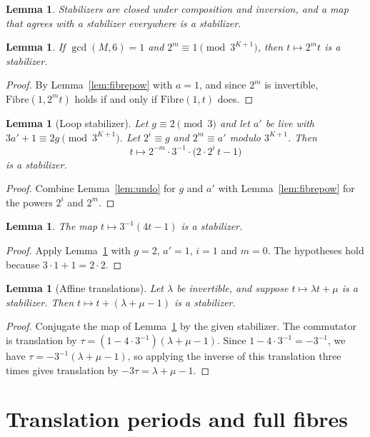\documentclass[11pt,reqno,oneside]{amsart}
\theoremstyle{plain}
\newtheorem{lemma}[theorem]{Lemma}
\theoremstyle{definition}
\numberwithin{equation}{section}
\begin{document}
\begin{lemma}\label{lem:stabcomp}
Stabilizers are closed under composition and inversion, and a map that agrees with a stabilizer everywhere is a stabilizer.
\end{lemma}

\begin{lemma}\label{lem:stabmul}
If $\gcd(M,6)=1$ and $2^m\equiv1\pmod{3^{K+1}}$, then $t\mapsto2^mt$ is a stabilizer.
\end{lemma}
\begin{proof}
By Lemma~\ref{lem:fibrepow} with $a=1$, and since $2^m$ is invertible, $\mathrm{Fibre}(1,2^mt)$ holds if and only if $\mathrm{Fibre}(1,t)$ does.
\end{proof}

\begin{lemma}[Loop stabilizer]\label{lem:loop}
Let $g\equiv2\pmod 3$ and let $a'$ be live with $3a'+1\equiv2g\pmod{3^{K+1}}$. Let $2^i\equiv g$ and $2^m\equiv a'$ modulo $3^{K+1}$. Then
\[
t\longmapsto 2^{-m}\cdot 3^{-1}\cdot\bigl(2\cdot 2^i\,t-1\bigr)
\]
is a stabilizer.
\end{lemma}
\begin{proof}
Combine Lemma~\ref{lem:undo} for $g$ and $a'$ with Lemma~\ref{lem:fibrepow} for the powers $2^i$ and $2^m$.
\end{proof}

\begin{lemma}\label{lem:ell}
The map $t\mapsto3^{-1}(4t-1)$ is a stabilizer.
\end{lemma}
\begin{proof}
Apply Lemma~\ref{lem:loop} with $g=2$, $a'=1$, $i=1$ and $m=0$. The hypotheses hold because $3\cdot1+1=2\cdot2$.
\end{proof}

\begin{lemma}[Affine translations]\label{lem:affine}
Let $\lambda$ be invertible, and suppose $t\mapsto\lambda t+\mu$ is a stabilizer. Then $t\mapsto t+(\lambda+\mu-1)$ is a stabilizer.
\end{lemma}
\begin{proof}
Conjugate the map of Lemma~\ref{lem:ell} by the given stabilizer. The commutator is translation by $\tau=(1-4\cdot3^{-1})(\lambda+\mu-1)$. Since $1-4\cdot3^{-1}=-3^{-1}$, we have $\tau=-3^{-1}(\lambda+\mu-1)$, so applying the inverse of this translation three times gives translation by $-3\tau=\lambda+\mu-1$.
\end{proof}

\section{Translation periods and full fibres}\label{sec:periods}
\end{document}
